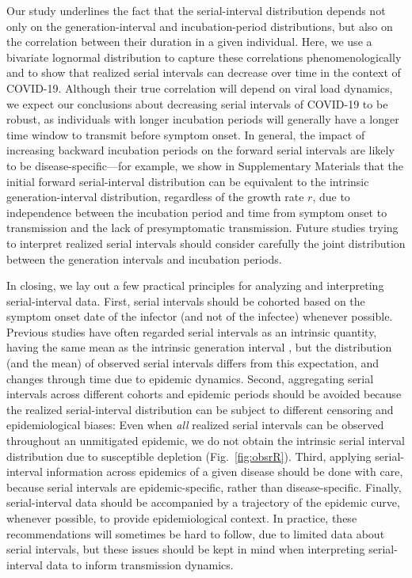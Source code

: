 \documentclass[12pt]{article}
\newcommand{\fref}[1]{Fig.~\ref{fig:#1}}
\begin{document}
Our study underlines the fact that the serial-interval distribution depends not only on the generation-interval and incubation-period distributions, but also on the correlation between their duration in a given individual.
Here, we use a bivariate lognormal distribution to capture these correlations phenomenologically and to show that realized serial intervals can decrease over time in the context of COVID-19.
Although their true correlation will depend on viral load dynamics, we expect our conclusions about decreasing serial intervals of COVID-19 to be robust, as individuals with longer incubation periods will generally have a longer time window to transmit before symptom onset.
In general, the impact of increasing backward incubation periods on the forward serial intervals are likely to be disease-specific---for example, we show in Supplementary Materials that the initial forward serial-interval distribution can be equivalent to the intrinsic generation-interval distribution, regardless of the growth rate $r$, due to independence between the incubation period and time from symptom onset to transmission and the lack of presymptomatic transmission.
Future studies trying to interpret realized serial intervals should consider carefully the joint distribution between the generation intervals and incubation periods.

In closing, we lay out a few practical principles for analyzing and interpreting serial-interval data.
First, serial intervals should be cohorted based on the symptom onset date of the infector (and not of the infectee) whenever possible.
Previous studies have often regarded serial intervals as an intrinsic quantity, having the same mean as the intrinsic generation interval \citep{svensson2007note,klinkenberg2011correlation,champredon2018equivalence, britton2019estimation}, but the distribution (and the mean) of observed serial intervals differs from this expectation, and changes through time due to epidemic dynamics.
Second, aggregating serial intervals across different cohorts and epidemic periods should be avoided because the realized serial-interval distribution can be subject to different censoring and epidemiological biases:
Even when \emph{all} realized serial intervals can be observed throughout an unmitigated epidemic, we do not obtain the intrinsic serial interval distribution due to susceptible depletion (\fref{obsrR}).
Third, applying serial-interval information across epidemics of a given disease should be done with care, because serial intervals are epidemic-specific, rather than disease-specific.
Finally, serial-interval data should be accompanied by a trajectory of the epidemic curve, whenever possible, to provide epidemiological context.
In practice, these recommendations will sometimes be hard to follow, due to limited data about serial intervals, but these issues should be kept in mind when interpreting serial-interval data to inform transmission dynamics.
\end{document}
